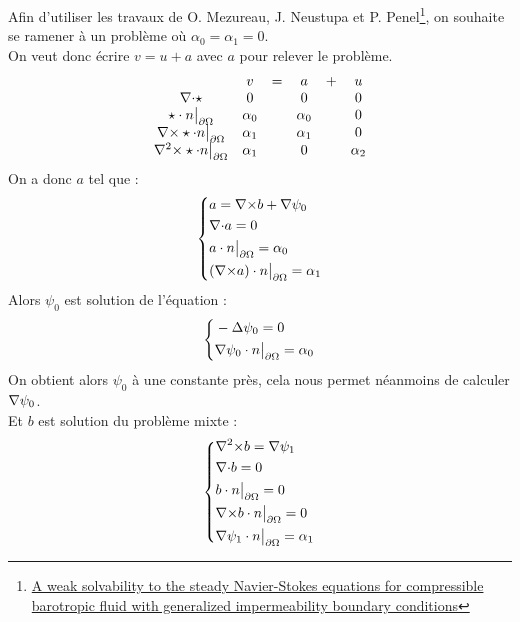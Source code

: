 Afin d'utiliser les travaux de O. Mezureau, J. Neustupa et P. Penel\footnote{\href{http://www.researchgate.net/publication/254219219\_A\_weak\_solvability\_to\_the\_steady\_NavierStokes\_equations\_for\_compressible\_barotropic\_fluid\_with\_generalized\_impermeability\_boundary\_conditions}{A weak solvability to the steady Navier-Stokes equations for compressible barotropic fluid with generalized impermeability boundary conditions}}, on souhaite se ramener à un problème où $\alpha_0=\alpha_1=0$.\\
On veut donc écrire $v=u+a$ avec $a$ pour relever le problème.
\[
\begin{array}{cccccc}
& v & = & a & + & u\\
{\nabla\cdot}\star & 0 & & 0 & & 0\\
\star\cdot n{\big\rvert_{\partial\Omega}} & \alpha_0 & & \alpha_0 & & 0\\
{\nabla\times}\star\cdot n{\big\rvert_{\partial\Omega}} & \alpha_1 & & \alpha_1 & & 0\\
{\nabla^2\times}\star\cdot n{\big\rvert_{\partial\Omega}} & \alpha_1 & & 0 & & \alpha_2 
\end{array}
\]
On a donc $a$ tel que :
\begin{eqnarray}
\label{aegal}
\left\{
\begin{aligned}
&a={\nabla\times} b+{\nabla}\psi_0\\
&{\nabla\cdot} a =0\\
&a\cdot n{\big\rvert_{\partial\Omega}} = \alpha_0\\
&({\nabla\times} a)\cdot n{\big\rvert_{\partial\Omega}} = \alpha_1
\end{aligned}
\right.
\end{eqnarray}
Alors $\psi_0$ est solution de l'équation :
\begin{eqnarray}
\label{psi0}
\left\{
\begin{aligned}
&-{\Delta}\psi_0 = 0\\
&{\nabla}\psi_0\cdot n{\big\rvert_{\partial\Omega}}=\alpha_0
\end{aligned}
\right.
\end{eqnarray}
On obtient alors $\psi_0$ à une constante près, cela nous permet néanmoins de calculer ${\nabla}\psi_0$.\\
Et $b$ est solution du problème mixte :
\begin{eqnarray}
\label{curlb}
\left\{
\begin{aligned}
&{\nabla^2\times} b = {\nabla}\psi_1\\
&{\nabla\cdot} b = 0\\
&b\cdot n{\big\rvert_{\partial\Omega}} = 0\\
&{\nabla\times} b\cdot n{\big\rvert_{\partial\Omega}} = 0\\
&{\nabla}\psi_1\cdot n{\big\rvert_{\partial\Omega}} = \alpha_1
\end{aligned}
\right.
\end{eqnarray}


